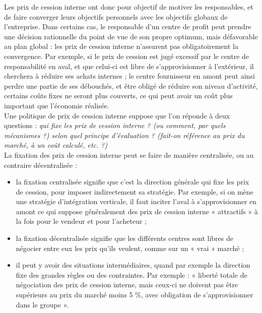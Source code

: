 \documentclass{kaobook}
\begin{document}
Les prix de cession interne ont donc pour objectif de motiver les responsables, et de faire converger leurs objectifs personnels avec les objectifs globaux de l’entreprise. Dans certains cas, le responsable d’un centre de profit peut prendre une décision rationnelle du point de vue de son propre optimum, mais défavorable au plan global : les prix de cession interne n’assurent pas obligatoirement la convergence. Par exemple, si le prix de cession est jugé excessif par le centre de responsabilité en aval, et que celui-ci est libre de s’approvisionner à l’extérieur, il cherchera à réduire ses achats internes ; le centre fournisseur en amont peut ainsi perdre une partie de ses débouchés, et être obligé de réduire son niveau d’activité, certains coûts fixes ne seront plus couverts, ce qui peut avoir un coût plus important que l'économie réalisée.\\

Une politique de prix de cession interne suppose que l’on réponde à deux questions : \emph{qui fixe les prix de cession interne ? (ou comment, par quels mécanismes ?) selon quel principe d’évaluation ? (fait-on référence au prix du marché, à un coût calculé, etc. ?)}\\
La fixation des prix de cession interne peut se faire de manière centralisée, ou au contraire décentralisée :\\
\begin{itemize}
\item la fixation centralisée signifie que c’est la direction générale qui fixe les prix de cession, pour imposer indirectement sa stratégie. Par exemple, si on mène une stratégie d’intégration verticale, il faut inciter l’aval à s’approvisionner en amont ce qui suppose généralement des prix de cession interne « attractifs » à la fois pour le vendeur et pour l’acheteur ;\\
\item la fixation décentralisée signifie que les différents centres sont libres de négocier entre eux les prix qu’ils veulent, comme sur un « vrai » marché ;\\
\item il peut y avoir des situations intermédiaires, quand par exemple la direction fixe des grandes règles ou des contraintes. Par exemple : « liberté totale de négociation des prix de cession interne, mais ceux-ci ne doivent pas être supérieurs au prix du marché moins 5 \%, avec obligation de s’approvisionner dans le groupe ».\\
\end{itemize}
\end{document}
